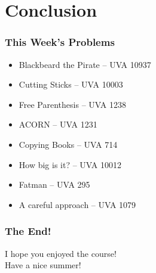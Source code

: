 \section{Conclusion}

\begin{frame}
  \frametitle{This Week's Problems}

  \begin{itemize}
  \item Blackbeard the Pirate -- UVA 10937
  \item Cutting Sticks -- UVA 10003
  \item Free Parenthesis -- UVA 1238
  \item ACORN -- UVA 1231
  \item Copying Books -- UVA 714
  \item How big is it? -- UVA 10012
  \item Fatman -- UVA 295
  \item A careful approach -- UVA 1079
  \end{itemize}

\end{frame}

\begin{frame}
  \frametitle{The End!}

  \begin{center}
    I hope you enjoyed the course!\\
    Have a nice summer!
  \end{center}
\end{frame}
